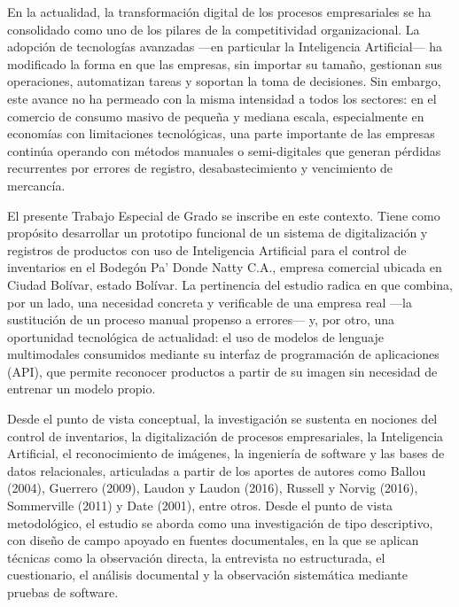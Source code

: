 \documentclass[12pt, letterpaper]{report}
\begin{document}
\hspace{1.25cm}En la actualidad, la transformación digital de los
procesos empresariales se ha consolidado como uno de los pilares de la
competitividad organizacional. La adopción de tecnologías avanzadas
---en particular la Inteligencia Artificial--- ha modificado la forma
en que las empresas, sin importar su tamaño, gestionan sus
operaciones, automatizan tareas y soportan la toma de decisiones. Sin
embargo, este avance no ha permeado con la misma intensidad a todos
los sectores: en el comercio de consumo masivo de pequeña y mediana
escala, especialmente en economías con limitaciones tecnológicas, una
parte importante de las empresas continúa operando con métodos
manuales o semi-digitales que generan pérdidas recurrentes por
errores de registro, desabastecimiento y vencimiento de mercancía.

El presente Trabajo Especial de Grado se inscribe en este contexto.
Tiene como propósito desarrollar un prototipo funcional de un sistema
de digitalización y registros de productos con uso de Inteligencia
Artificial para el control de inventarios en el Bodegón Pa' Donde
Natty C.A., empresa comercial ubicada en Ciudad Bolívar, estado
Bolívar. La pertinencia del estudio radica en que combina, por un
lado, una necesidad concreta y verificable de una empresa real ---la
sustitución de un proceso manual propenso a errores--- y, por otro,
una oportunidad tecnológica de actualidad: el uso de modelos de
lenguaje multimodales consumidos mediante su interfaz de programación
de aplicaciones (API), que permite reconocer productos a partir de su
imagen sin necesidad de entrenar un modelo propio.

Desde el punto de vista conceptual, la investigación se sustenta en
nociones del control de inventarios, la digitalización de procesos
empresariales, la Inteligencia Artificial, el reconocimiento de
imágenes, la ingeniería de software y las bases de datos relacionales,
articuladas a partir de los aportes de autores como Ballou (2004),
Guerrero (2009), Laudon y Laudon (2016), Russell y Norvig (2016),
Sommerville (2011) y Date (2001), entre otros. Desde el punto de vista
metodológico, el estudio se aborda como una investigación de tipo
descriptivo, con diseño de campo apoyado en fuentes documentales, en
la que se aplican técnicas como la observación directa, la entrevista
no estructurada, el cuestionario, el análisis documental y la
observación sistemática mediante pruebas de software.
\end{document}

